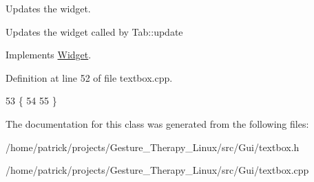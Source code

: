 Updates the widget. 

Updates the widget called by Tab\+::update 

Implements \hyperlink{class_widget_a726dc97add2c6eb82967144207280ace}{Widget}.



Definition at line 52 of file textbox.\+cpp.


\begin{DoxyCode}
53 \{
54     
55 \}
\end{DoxyCode}


The documentation for this class was generated from the following files\+:\begin{DoxyCompactItemize}
\item 
/home/patrick/projects/\+Gesture\+\_\+\+Therapy\+\_\+\+Linux/src/\+Gui/textbox.\+h\item 
/home/patrick/projects/\+Gesture\+\_\+\+Therapy\+\_\+\+Linux/src/\+Gui/textbox.\+cpp\end{DoxyCompactItemize}
